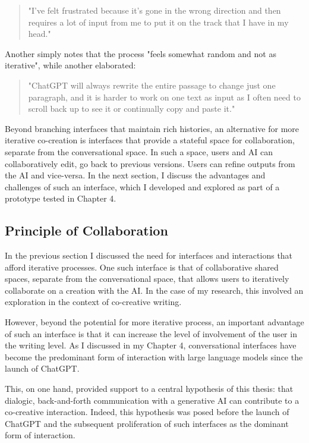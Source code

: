 \begin{quote}
"I've felt frustrated because it's gone in the wrong direction and then requires a lot of input from me to put it on the track that I have in my head."
\end{quote}

Another simply notes that the process "feels somewhat random and not as iterative", while another elaborated:

\begin{quote}
"ChatGPT will always rewrite the entire passage to change just one paragraph, and it is harder to work on one text as input as I often need to scroll back up to see it or continually copy and paste it."
\end{quote}

Beyond branching interfaces that maintain rich histories, an alternative for more iterative co-creation is interfaces that provide a stateful space for collaboration, separate from the conversational space. In such a space, users and AI can collaboratively edit, go back to previous versions. Users can refine outputs from the AI and vice-versa. In the next section, I discuss the advantages and challenges of such an interface, which I developed and explored as part of a prototype tested in Chapter 4. 

\subsection{Principle of Collaboration}

In the previous section I discussed the need for interfaces and interactions that afford iterative processes. One such interface is that of collaborative shared spaces, separate from the conversational space, that allows users to iteratively collaborate on a creation with the AI. In the case of my research, this involved an exploration in the context of co-creative writing. 

However, beyond the potential for more iterative process, an important advantage of such an interface is that it can increase the level of involvement of the user in the writing level. As I discussed in my Chapter 4, conversational interfaces have become the predominant form of interaction with large language models since the launch of ChatGPT. 

This, on one hand, provided support to a central hypothesis of this thesis: that dialogic, back-and-forth communication with a generative AI can contribute to a co-creative interaction. Indeed, this hypothesis was posed before the launch of ChatGPT and the subsequent proliferation of such interfaces as the dominant form of interaction. 

